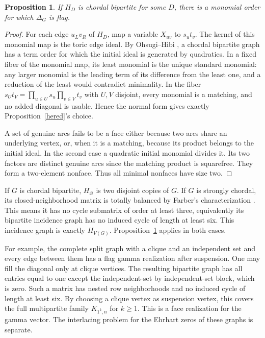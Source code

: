 \documentclass[11pt]{article}
\newtheorem{proposition}[theorem]{Proposition}
\begin{document}
\begin{proposition}\label{diagonal}
If $H_D$ is chordal bipartite for some $D$, there is a monomial order for which $\Delta_G$ is flag.
\end{proposition}
\begin{proof}
For each edge $u_Lv_R$ of $H_D$, map a variable $X_{uv}$ to $s_ut_v$. The kernel of this monomial map is the toric edge ideal. By Ohsugi--Hibi \cite{OH}, a chordal bipartite graph has a term order for which the initial ideal is generated by quadratics. In a fixed fiber of the monomial map, its least monomial is the unique standard monomial: any larger monomial is the leading term of its difference from the least one, and a reduction of the least would contradict minimality. In the fiber $s_Ut_V=\prod_{u\in U}s_u\prod_{v\in V}t_v$ with $U,V$ disjoint, every monomial is a matching, and no added diagonal is usable. Hence the normal form gives exactly Proposition~\ref{hered}'s choice.

A set of genuine arcs fails to be a face either because two arcs share an underlying vertex, or, when it is a matching, because its product belongs to the initial ideal. In the second case a quadratic initial monomial divides it. Its two factors are distinct genuine arcs since the matching product is squarefree. They form a two-element nonface. Thus all minimal nonfaces have size two.
\end{proof}

If $G$ is chordal bipartite, $H_\varnothing$ is two disjoint copies of $G$. If $G$ is strongly chordal, its closed-neighborhood matrix is totally balanced by Farber's characterization \cite{Farber}. This means it has no cycle submatrix of order at least three, equivalently its bipartite incidence graph has no induced cycle of length at least six. This incidence graph is exactly $H_{V(G)}$. Proposition~\ref{diagonal} applies in both cases.

For example, the complete split graph with a clique and an independent set and every edge between them has a flag gamma realization after suspension. One may fill the diagonal only at clique vertices. The resulting bipartite graph has all entries equal to one except the independent-set by independent-set block, which is zero. Such a matrix has nested row neighborhoods and no induced cycle of length at least six. By choosing a clique vertex as suspension vertex, this covers the full multipartite family $K_{1^k,n}$ for $k\ge1$. This is a face realization for the gamma vector. The interlacing problem for the Ehrhart zeros of these graphs \cite{Kolbl} is separate.
\end{document}
